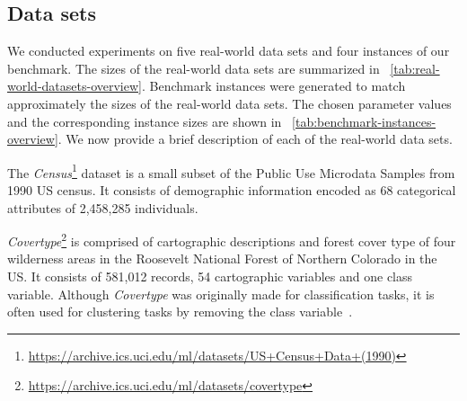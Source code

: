 


\subsection{Data sets}
We conducted experiments on five real-world data sets and four instances of our benchmark. The sizes of the real-world data sets are summarized in ~\cref{tab:real-world-datasets-overview}. Benchmark instances were generated to match approximately the sizes of the real-world data sets. The chosen parameter values and the corresponding instance sizes are shown in ~\cref{tab:benchmark-instances-overview}. 
We now provide a brief description of each of the real-world data sets.

The \textit{Census}\footnote{\url{https://archive.ics.uci.edu/ml/datasets/US+Census+Data+(1990)}} dataset is a small subset of the Public Use Microdata Samples from 1990 US census. It consists of demographic information encoded as 68 categorical attributes of 2,458,285 individuals. 

\textit{Covertype}\footnote{\url{https://archive.ics.uci.edu/ml/datasets/covertype}} is comprised of cartographic descriptions and forest cover type of four wilderness areas in the Roosevelt National Forest of Northern Colorado in the US. It consists of 581,012 records, 54 cartographic variables and one class variable. Although \textit{Covertype} was originally made for classification tasks, it is often used for clustering tasks by removing the class variable~\cite{AckermannMRSLS12}.

